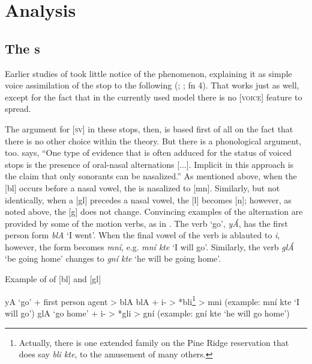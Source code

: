 \documentclass[output=paper]{LSP/langsci}
\begin{document}
\section{Analysis}

\subsection{The s}

Earlier studies of   took little notice of the  phenomenon, explaining it as simple voice assimilation of the stop to the following  (\citealt[37]{Carter1974}; \citealt[7]{Shaw1980}; \citealt[22]{Patterson1990} fn 4). That works just as well, except for the fact that in the currently used model there is no [\textsc{voice}] feature to spread.

The argument for [\textsc{sv}] in these stops, then, is based first of all on the fact that there is no other choice within the theory. But there is a phonological argument, too. \citet[180]{Botma2011} says, ``One type of evidence that is often adduced for the  status of voiced stops is the presence of oral-nasal alternations [...]. Implicit in this approach is the claim that only sonorants can be nasalized.'' As mentioned above, when the [bl]  occurs before a nasal vowel, the  is nasalized to [mn]. Similarly, but not identically, when a [gl]  precedes a nasal vowel, the [l] becomes [n]; however, as noted above, the [g] does not change. Convincing examples of the alternation are provided by some of the motion verbs, as in . The verb `go', \textit{y\'A}, has the first person form \textit{blA} `I went'. When the final vowel of the verb is ablauted to \textit{i}, however, the form becomes \textit{mn\'i}, e.g. \textit{mn\'i kte} `I will go'. Similarly, the verb \textit{gl\'A} `be going home' changes to \textit{gn\'i kte} `he will be going home'.

\begin{exe}
\ex \label{ex:rood:9}
Example of  of [bl] and [gl]
\begin{xlist}
\ex yA `go' + first person agent > blA
\ex blA + i- > *bli\footnote{Actually, there is one extended family on the Pine Ridge reservation that does say \textit{bli kte}, to the amusement of many others.} > mni (example: mn\'i kte `I will go')
\ex glA `go home' + i- > *gli > gn\'i (example: gn\'i kte `he will go home')
\end{xlist}
\end{exe}
\end{document}
